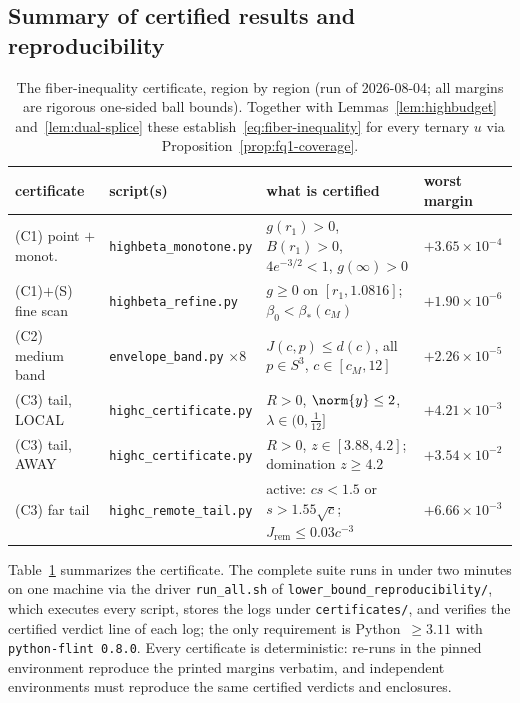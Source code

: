 \subsection{Summary of certified results and reproducibility}
\label{app:cert-summary}

\begin{table}[h]\centering
\footnotesize
\setlength{\tabcolsep}{4pt}
\begin{tabular}{llll}
\hline
certificate & script(s) & what is certified & worst margin \\
\hline
(C1) point $+$ monot. & \texttt{highbeta\_monotone.py} & $g(r_1)>0$, $B(r_1)>0$, $4e^{-3/2}<1$, $g(\infty)>0$ & $+3.65\times10^{-4}$ \\
(C1)$+$(S) fine scan & \texttt{highbeta\_refine.py} & $g\ge0$ on $[r_1,1.0816]$; $\beta_0<\beta_*(c_M)$ & $+1.90\times10^{-6}$ \\
(C2) medium band & \texttt{envelope\_band.py} $\times8$ & $J(c,p)\le d(c)$, all $p\in S^3$, $c\in[c_M,12]$ & $+2.26\times10^{-5}$ \\
(C3) tail, LOCAL & \texttt{highc\_certificate.py} & $R>0$, $\norm{y}\le2$, $\lambda\in(0,\tfrac1{12}]$ & $+4.21\times10^{-3}$ \\
(C3) tail, AWAY & \texttt{highc\_certificate.py} & $R>0$, $z\in[3.88,4.2]$; domination $z\ge4.2$ & $+3.54\times10^{-2}$ \\
(C3) far tail & \texttt{highc\_remote\_tail.py} & active: $cs<1.5$ or $s>1.55\sqrt c$; $J_{\mathrm{rem}}\le0.03c^{-3}$ & $+6.66\times10^{-3}$ \\
\hline
\end{tabular}
\caption{The fiber-inequality certificate, region by region (run of 2026-08-04; all margins are rigorous one-sided ball bounds). Together with Lemmas~\ref{lem:highbudget} and~\ref{lem:dual-splice} these establish~\eqref{eq:fiber-inequality} for every ternary $u$ via Proposition~\ref{prop:fq1-coverage}.}
\label{tab:fq1-results}
\end{table}

Table~\ref{tab:fq1-results} summarizes the certificate. The complete suite runs in under two minutes on one machine via the driver \texttt{run\_all.sh} of \texttt{lower\_bound\_reproducibility/}, which executes every script, stores the logs under \texttt{certificates/}, and verifies the certified verdict line of each log; the only requirement is Python~$\ge3.11$ with \texttt{python-flint~0.8.0}. Every certificate is deterministic: re-runs in the pinned environment reproduce the printed margins verbatim, and independent environments must reproduce the same certified verdicts and enclosures.


